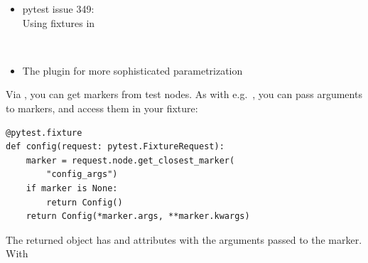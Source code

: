 \begin{itemize}
    \item[] \hspace{-1.25em}\hspace{1em}\begin{minipage}{.9\linewidth}pytest issue 349: \\ Using fixtures in \end{minipage} \\[.25em]
    \item[] \hspace{-1.25em}\hspace{1em}\begin{minipage}{.9\linewidth}The  plugin for more sophisticated parametrization\end{minipage}
\end{itemize}

%


Via , you can get markers from test nodes.
As with e.g.\ ,
you can pass
arguments to markers, and access them in your fixture:

\begin{verbatim}
@pytest.fixture
def config(request: pytest.FixtureRequest):
    marker = request.node.get_closest_marker(
        "config_args")
    if marker is None:
        return Config()
    return Config(*marker.args, **marker.kwargs)
\end{verbatim}

The returned  object has  and  attributes with
the arguments passed to the marker. With

